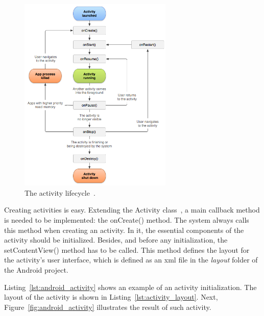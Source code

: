 \begin{figure}
\centering
\includegraphics[width=0.65\textwidth]{activity_lifecycle.png}
\caption{The activity lifecycle~\citep{activities}.}
\label{fig:activity_lifecycle}
\end{figure}

Creating activities is easy. Extending the Activity class~\citep{activities},
a main callback method is needed to be implemented: the onCreate() method. The
system always calls this method when creating an activity. In it, the essential
components of the activity should be initialized. Besides, and before any
initialization, the setContentView() method has to be called. This method defines
the layout for the activity's user interface, which is defined as an \ac{xml}
file in the \textit{layout} folder of the Android project.

Listing~\ref{lst:android_activity} shows an example of an activity initialization.
The layout of the activity is shown in Listing~\ref{lst:activity_layout}. Next,
Figure~\ref{fig:android_activity} illustrates the result of such activity.

\inputminted[linenos=true, fontsize=\footnotesize, frame=lines]{java}{4_system_architecture/android_activity.java}

\inputminted[linenos=true, fontsize=\footnotesize, frame=lines]{xml}{4_system_architecture/activity_layout.xml}

